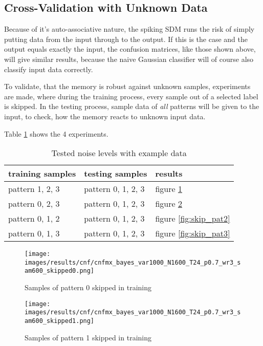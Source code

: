 \newpage
\subsection{Cross-Validation with Unknown Data}
Because of it's auto-associative nature, the spiking \ac{SDM} runs the risk of simply putting data from the input through to the output.
If this is the case and the output equals exactly the input,
the confusion matrices, like those shown above, will give similar results, because the naive Gaussian classifier will of course also classify input data correctly.

To validate, that the memory is robust against unknown samples,
experiments are made, where during the training process, every sample out of a selected label is skipped.
In the testing process, sample data of \textit{all} patterns will be given to the input, to check,
how the memory reacts to unknown input data.

Table \ref{tab:xvalid_unknown} shows the 4 experiments.

\begin{table}[h]\centering
    \caption{Tested noise levels with example data}
    \label{tab:xvalid_unknown}
    \begin{tabular}{l|l|l}
        \textbf{training samples} & \textbf{testing samples} & \textbf{results}\\
        \hline
        pattern 1, 2, 3 & pattern 0, 1, 2, 3 & figure \ref{fig:skip_pat0}\\
        pattern 0, 2, 3 & pattern 0, 1, 2, 3 & figure \ref{fig:skip_pat1}\\
        pattern 0, 1, 2 & pattern 0, 1, 2, 3 & figure \ref{fig:skip_pat2}\\
        pattern 0, 1, 3 & pattern 0, 1, 2, 3 & figure \ref{fig:skip_pat3}
    \end{tabular}
\end{table}

\begin{figure}[H]
    \centering
    \texttt{[image: images/results/cnf/cnfmx\_bayes\_var1000\_N1600\_T24\_p0.7\_wr3\_sam600\_skipped0.png]}
    \caption{Samples of pattern 0 skipped in training}
    \label{fig:skip_pat0}
\end{figure}

\begin{figure}[H]
    \centering
    \texttt{[image: images/results/cnf/cnfmx\_bayes\_var1000\_N1600\_T24\_p0.7\_wr3\_sam600\_skipped1.png]}
    \caption{Samples of pattern 1 skipped in training}
    \label{fig:skip_pat1}
\end{figure}


